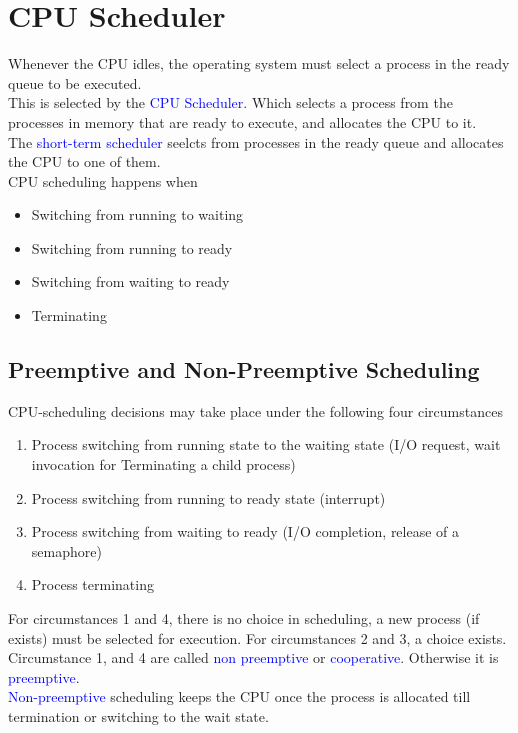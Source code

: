 \documentclass[oneside]{book}
\begin{document}
        \section{CPU Scheduler}
            Whenever the CPU idles, the operating system must select a process in the ready queue to be 
            executed.\\
            This is selected by the \textcolor{blue}{CPU Scheduler}. Which selects a process from the processes
            in memory that are ready to execute, and allocates the CPU to it.\\
            The \textcolor{blue}{short-term scheduler} seelcts from processes in the ready queue and allocates 
            the CPU to one of them.\\
            CPU scheduling happens when
            \begin{itemize}
                \item Switching from running to waiting
                \item Switching from running to ready
                \item Switching from waiting to ready
                \item Terminating
            \end{itemize}
            \subsection{Preemptive and Non-Preemptive Scheduling}
                CPU-scheduling decisions may take place under the following four circumstances
                \begin{enumerate}
                    \item Process switching from running state to the waiting state (I/O request, wait invocation for Terminating
                    a child process)
                    \item Process switching from running to ready state (interrupt)
                    \item Process switching from waiting to ready (I/O completion, release of a semaphore)
                    \item Process terminating
                \end{enumerate}
                For circumstances 1 and 4, there is no choice in scheduling, a new process (if exists) must be
                selected for execution. For circumstances 2 and 3, a choice exists.\\
                Circumstance 1, and 4 are called \textcolor{blue}{non preemptive} or \textcolor{blue}{cooperative}.
                Otherwise it is \textcolor{blue}{preemptive}.\\
                \textcolor{blue}{Non-preemptive} scheduling keeps the CPU once the process is allocated till termination
                or switching to the wait state.
\end{document}
